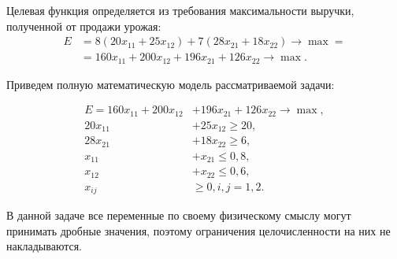 Целевая функция определяется из требования максимальности выручки, полученной от продажи урожая:
\begin{equation}
  \label{eq:BaseOpt}
  \begin{aligned}
    E &= 8(20x_{11} + 25x_{12}) + 7(28x_{21} + 18x_{22}) \rightarrow \max = \\
    &= 160x_{11} + 200x_{12} + 196x_{21} + 126x_{22} \rightarrow \max.
  \end{aligned}
\end{equation}

\pagebreak

Приведем полную математическую модель рассматриваемой задачи:

\begin{equation}
  \label{eq:BaseNSM}
    \begin{aligned}
      E = 160x_{11} + 200x_{12} &+ 196x_{21} + 126x_{22} \rightarrow \max, \\
      20x_{11} &+ 25x_{12} \ge 20, \\
      28x_{21} &+ 18x_{22} \ge 6, \\
      x_{11} &+ x_{21} \le 0{,}8, \\
      x_{12} &+ x_{22} \le 0{,}6, \\
      x_{ij} & \ge 0, i, j = 1, 2.
    \end{aligned}
\end{equation}

В данной задаче все переменные по своему физическому смыслу могут
принимать дробные значения, поэтому ограничения целочисленности на них не
накладываются.

\pagebreak